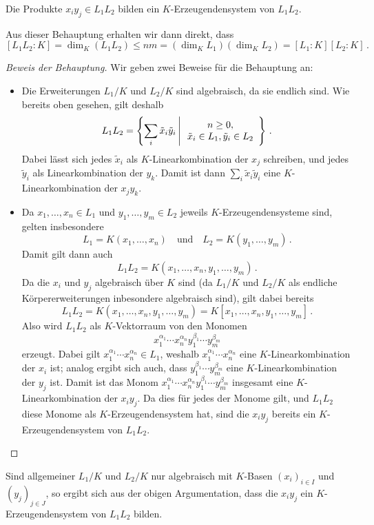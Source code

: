 \begin{claim*}
  Die Produkte $x_i y_j \in L_1 L_2$ bilden ein $K$-Erzeugendensystem von $L_1 L_2$.
\end{claim*}

Aus dieser Behauptung erhalten wir dann direkt, dass
\[
        [L_1 L_2 : K]
  =     \dim_K ( L_1 L_2 )
  \leq  n m
  =     (\dim_K L_1)(\dim_K L_2)
  =     [L_1 : K][L_2 : K] \,.
\]

\begin{proof}[Beweis der Behauptung]
  Wir geben zwei Beweise für die Behauptung an:
  \begin{itemize}
    \item
      Die Erweiterungen $L_1/K$ und $L_2/K$ sind algebraisch, da sie endlich sind.
      Wie bereits oben gesehen, gilt deshalb
      \[
          L_1 L_2
        = \left\{
            \sum_i \tilde{x}_i \tilde{y}_i
          \suchthat*
            \begin{array}{c}
              n \geq 0,
            \\
              \tilde{x}_i \in L_1,
              \tilde{y}_i \in L_2
            \end{array}
          \right\} \,.
      \]
      Dabei lässt sich jedes $\tilde{x}_i$ als $K$-Linearkombination der $x_j$ schreiben, und jedes $\tilde{y}_i$ als Linearkombination der $y_k$.
      Damit ist dann $\sum_i \tilde{x}_i \tilde{y}_i$ eine $K$-Linearkombination der $x_j y_k$.
      
    \item
      Da $x_1, \dotsc, x_n \in L_1$ und $y_1, \dotsc, y_m \in L_2$ jeweils $K$-Erzeugendensysteme sind, gelten insbesondere
      \[
          L_1
        = K(x_1, \dotsc, x_n)
        \quad\text{und}\quad
          L_2
        = K(y_1, \dotsc, y_m) \,.
      \]
      Damit gilt dann auch
      \[
          L_1 L_2
        = K(x_1, \dotsc, x_n, y_1, \dotsc, y_m) \,.
      \]
      Da die $x_i$ und $y_j$ algebraisch über $K$ sind (da $L_1/K$ und $L_2/K$ als endliche Körpererweiterungen inbesondere algebraisch sind), gilt dabei bereits
      \[
          L_1 L_2
        = K(x_1, \dotsc, x_n, y_1, \dotsc, y_m)
        = K[x_1, \dotsc, x_n, y_1, \dotsc, y_m] \,.
      \]
      Also wird $L_1 L_2$ als $K$-Vektorraum von den Monomen
      \[
        x_1^{\alpha_1} \dotsm x_n^{\alpha_n} y_1^{\beta_1} \dotsm y_m^{\beta_m}
      \]
      erzeugt.
      Dabei gilt $x_1^{\alpha_1} \dotsm x_n^{\alpha_n} \in L_1$, weshalb $x_1^{\alpha_1} \dotsm x_n^{\alpha_n}$ eine $K$-Linear\-kombi\-nation der $x_i$ ist;
      analog ergibt sich auch, dass $y_1^{\beta_1} \dotsm y_m^{\beta_m}$ eine $K$-Linear\-kombi\-nation der $y_j$ ist.
      Damit ist das Monom $x_1^{\alpha_1} \dotsm x_n^{\alpha_n} y_1^{\beta_1} \dotsm y_m^{\beta_m}$ insgesamt eine $K$-Linear\-kombi\-nation der $x_i y_j$.
      Da dies für jedes der Monome gilt, und $L_1 L_2$ diese Monome als $K$-Erzeugendensystem hat, sind die $x_i y_j$ bereits ein $K$-Erzeugendensystem von $L_1 L_2$.
  \end{itemize}
\end{proof}

\begin{remark}
  Sind allgemeiner $L_1/K$ und $L_2/K$ nur algebraisch mit $K$-Basen $(x_i)_{i \in I}$ und $(y_j)_{j \in J}$, so ergibt sich aus der obigen Argumentation, dass die $x_i y_j$ ein $K$-Erzeugendensystem von $L_1 L_2$ bilden.
\end{remark}





